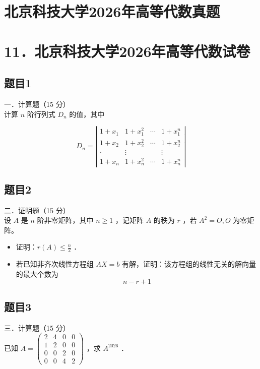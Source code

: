 \documentclass{article}
\begin{document}
\section*{北京科技大学2026年高等代数真题}
\section*{11．北京科技大学2026年高等代数试卷}

\subsection{题目1}
一．计算题（15 分）\\
计算 \(n\) 阶行列式 \(D_{n}\) 的值，其中

\[
D_{n}=\left|\begin{array}{cccc}
1+x_{1} & 1+x_{1}^{2} & \cdots & 1+x_{1}^{n} \\
1+x_{2} & 1+x_{2}^{2} & \cdots & 1+x_{2}^{n} \\
\cdot & \vdots & & \vdots \\
1+x_{n} & 1+x_{n}^{2} & \cdots & 1+x_{n}^{n}
\end{array}\right|
\]

\subsection{题目2}
二．证明题（15 分）\\
设 \(A\) 是 \(n\) 阶非零矩阵，其中 \(n \geq 1\) ，记矩阵 \(A\) 的秩为 \(r\) ，若 \(A^{2}=O, O\) 为零矩阵。

\begin{itemize}
  \item[（1）] 证明：\(r(A) \leq \frac{n}{2}\) ．
  \item[（2）] 若已知非齐次线性方程组 \(A X=b\) 有解，证明：该方程组的线性无关的解向量的最大个数为
\[
n-r+1
\]
\end{itemize}

\subsection{题目3}
三．计算题（15 分）\\
已知 \(A=\left(\begin{array}{llll}2 & 4 & 0 & 0 \\ 1 & 2 & 0 & 0 \\ 0 & 0 & 2 & 0 \\ 0 & 0 & 4 & 2\end{array}\right)\) ，求 \(A^{2026}\) ．
\end{document}
